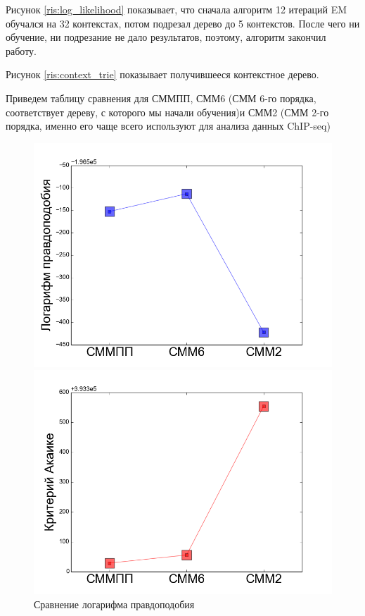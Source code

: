 \documentclass{matmex-diploma-custom}
\begin{document}
Рисунок \ref{ris:log_likelihood} показывает, что сначала алгоритм 12 итераций EM обучался на 32 контекстах, потом подрезал дерево до 5 контекстов. После чего ни обучение, ни подрезание не дало результатов, поэтому, алгоритм закончил работу.

Рисунок \ref{ris:context_trie} показывает получившееся контекстное дерево.

Приведем таблицу сравнения для СММПП, СММ6 (СММ 6-го порядка, соответствует дереву, с которого мы начали обучения)и СММ2 (СММ 2-го порядка, именно его чаще всего используют для анализа данных ChIP-seq)
\begin{figure}[h!]\centering
\begin{minipage}[b]{0.32 \textwidth}
	\includegraphics[scale=0.28]{img/real/log_p.png}
	\centering
	\caption{ Сравнение логарифма правдоподобия}
	\label{ris:real_comp_log_p}
\end{minipage}
\hfill
\begin{minipage}[b]{0.32 \textwidth}
	\includegraphics[scale=0.28]{img/real/aic.png}

\end{minipage}
\end{figure}
\end{document}
